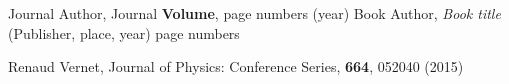 \begin{thebibliography}{}
Journal Author, Journal \textbf{Volume}, page numbers (year)
Book Author, \textit{Book title} (Publisher, place, year) page numbers

Renaud Vernet, Journal of Physics: Conference Series, \textbf{664}, 052040 (2015)


\end{thebibliography}
